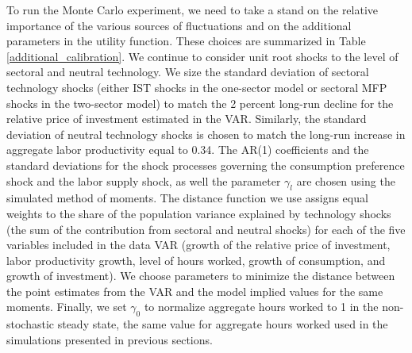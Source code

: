 \documentclass[12pt,fleqn]{article}
\begin{document}
{\normalsize To run the Monte Carlo experiment, we need to take a stand on
the relative importance of the various sources of fluctuations and on the
additional parameters in the utility function. These choices are summarized
in Table \ref{additional_calibration}. We continue
to consider unit root shocks to the level of sectoral and neutral
technology. We size the standard deviation of sectoral technology shocks
(either IST shocks in the one-sector model or sectoral MFP shocks in the
two-sector model) to match the 2 percent long-run decline for the relative
price of investment estimated in the VAR. Similarly, the standard deviation
of neutral technology shocks is chosen to match the long-run increase in
aggregate labor productivity equal to 0.34. The AR(1) coefficients and the
standard deviations for the shock processes governing the consumption
preference shock and the labor supply shock, as well the parameter $\gamma_l$
are chosen using the simulated method of moments. The distance function we
use assigns equal weights to the share of the population variance explained
by technology shocks (the sum of the contribution from sectoral and neutral
shocks) for each of the five variables included in the data VAR (growth of
the relative price of investment, labor productivity growth, level of hours
worked, growth of consumption, and growth of investment). We choose
parameters to minimize the distance between the point estimates from the VAR
and the model implied values for the same moments. Finally, we set $%
\gamma_{0}$ to normalize aggregate hours worked to 1 in the non-stochastic
steady state, the same value for aggregate hours worked used in the
simulations presented in previous sections. }
\end{document}
